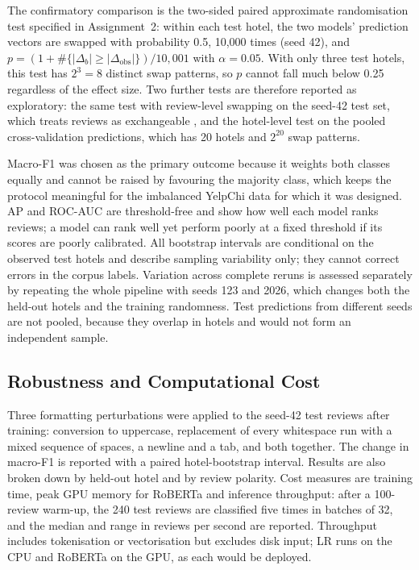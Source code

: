 The confirmatory comparison is the two-sided paired approximate randomisation test specified in Assignment~2: within each test hotel, the two models' prediction vectors are swapped with probability 0.5, 10,000 times (seed 42), and $p=(1+\#\{|\Delta_b|\ge|\Delta_\mathrm{obs}|\})/10{,}001$ with $\alpha=0.05$. With only three test hotels, this test has $2^3=8$ distinct swap patterns, so $p$ cannot fall much below 0.25 regardless of the effect size. Two further tests are therefore reported as exploratory: the same test with review-level swapping on the seed-42 test set, which treats reviews as exchangeable \cite{dror2018}, and the hotel-level test on the pooled cross-validation predictions, which has 20 hotels and $2^{20}$ swap patterns.

Macro-F1 was chosen as the primary outcome because it weights both classes equally and cannot be raised by favouring the majority class, which keeps the protocol meaningful for the imbalanced YelpChi data for which it was designed. AP and ROC-AUC are threshold-free and show how well each model ranks reviews; a model can rank well yet perform poorly at a fixed threshold if its scores are poorly calibrated. All bootstrap intervals are conditional on the observed test hotels and describe sampling variability only; they cannot correct errors in the corpus labels. Variation across complete reruns is assessed separately by repeating the whole pipeline with seeds 123 and 2026, which changes both the held-out hotels and the training randomness. Test predictions from different seeds are not pooled, because they overlap in hotels and would not form an independent sample.

\subsection{Robustness and Computational Cost}
\label{sec:costmethod}
Three formatting perturbations were applied to the seed-42 test reviews after training: conversion to uppercase, replacement of every whitespace run with a mixed sequence of spaces, a newline and a tab, and both together. The change in macro-F1 is reported with a paired hotel-bootstrap interval. Results are also broken down by held-out hotel and by review polarity. Cost measures are training time, peak GPU memory for RoBERTa and inference throughput: after a 100-review warm-up, the 240 test reviews are classified five times in batches of 32, and the median and range in reviews per second are reported. Throughput includes tokenisation or vectorisation but excludes disk input; LR runs on the CPU and RoBERTa on the GPU, as each would be deployed.

